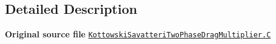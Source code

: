 \subsection{Detailed Description}
{\bfseries Original source file} \href{../../../home/carlo/data/GeN-Foam/GeN-Foam_ffn/GeN-Foam/GeN-Foam/classes/thermalHydraulics/src/physicsModels/dragModels/twoPhaseDragMultiplierModels/KottowskiSavatteri/KottowskiSavatteriTwoPhaseDragMultiplier.C}{\tt Kottowski\+Savatteri\+Two\+Phase\+Drag\+Multiplier.\+C} 